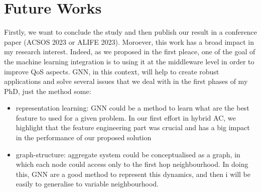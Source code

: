 \documentclass{article}
\begin{document}
\section{Future Works}
Firstly, we want to conclude the study and then publish our result in a conference paper (ACSOS 2023 or ALIFE 2023).
Moroever, this work has a broad impact in my research interest. Indeed, as we proposed in the first pleace, one of the goal of the machine learning integration is to using it at the middleware level in order to improve QoS aspects. GNN, in this context, will help to create robust applications and solve several issues that we deal with in the first phases of my PhD, just the method some:
\begin{itemize}
    \item representation learning: GNN could be a method to learn what are the best feature to used for a given problem. In our first effort in hybrid AC, we highlight that the feature engineering part was crucial and has a big impact in the performance of our proposed solution
    \item graph-structure: aggregate system could be conceptualised as a graph, in which each node could access only to the first hop neighbourhood. In doing this, GNN are a good method to represent this dynamics, and then i will be easily to generalise to variable neighbourhood.
\end{itemize}


\end{document}
